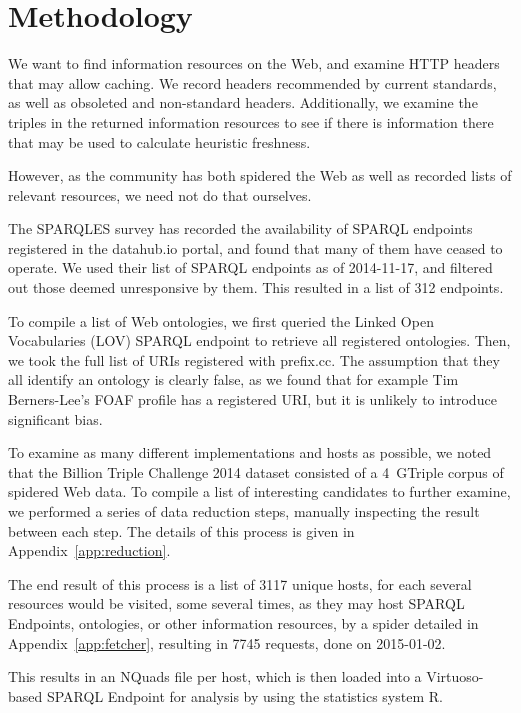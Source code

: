 \documentclass{llncs}
\begin{document}
\section{Methodology}

We want to find information resources on the Web, and examine HTTP
headers that may allow caching. We record headers recommended by
current standards, as well as obsoleted and non-standard
headers. Additionally, we examine the triples in the returned
information resources to see if there is information there that may be
used to calculate heuristic freshness.

However, as the community has both spidered the Web as well as
recorded lists of relevant resources, we need not do that ourselves. 

The SPARQLES survey\cite{buil2013sparql} has recorded the availability
of SPARQL endpoints registered in the datahub.io portal, and found
that many of them have ceased to operate. We used their list of SPARQL
endpoints as of 2014-11-17, and filtered out those deemed unresponsive
by them. This resulted in a list of 312 endpoints.

To compile a list of Web ontologies, we first queried the Linked Open
Vocabularies (LOV) \cite{lov2} SPARQL endpoint
to retrieve all registered ontologies. Then, we took the full list of
URIs registered with prefix.cc. The assumption that they all identify
an ontology is clearly false, as we found that for example Tim
Berners-Lee's FOAF profile has a registered URI, but it is unlikely to
introduce significant bias.

To examine as many different implementations and hosts as possible, we
noted that the Billion Triple Challenge 2014 \cite{btc-2014} dataset
consisted of a 4~GTriple corpus of spidered Web data. To compile a
list of interesting candidates to further examine, we performed a
series of data reduction steps, manually inspecting the result between
each step. The details of this process is given in
Appendix~\ref{app:reduction}.

The end result of this process is a list of 3117 unique hosts, for
each several resources would be visited, some several times, as they
may host SPARQL Endpoints, ontologies, or other information resources,
by a spider detailed in Appendix~\ref{app:fetcher}, resulting in 7745
requests, done on 2015-01-02.

This results in an NQuads file per host, which is then loaded into a
Virtuoso-based SPARQL Endpoint for analysis by using the statistics
system R\cite{kn:r}.
\end{document}
